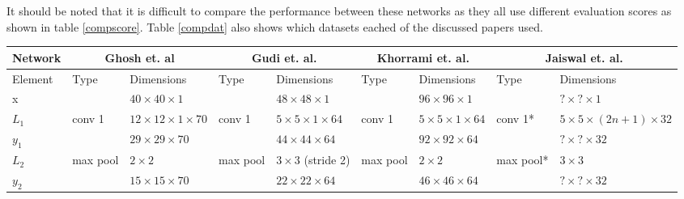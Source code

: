 It should be noted that it is difficult to compare the performance between these
networks as they all use different evaluation scores as shown in table \ref{compscore}. Table \ref{compdat} also shows
which datasets eached of the discussed papers used.
\begin{landscape}
\begin{table}[h!]
{\footnotesize
\begin{tabular}{|lllllllll|}
\hline
Network                      & \multicolumn{2}{c}{Ghosh et. al\cite{Ghosh2015}}                         & \multicolumn{2}{c}{Gudi et. al.\cite{Gudi2015}}                            & \multicolumn{2}{c}{Khorrami et. al.\cite{dodeeplearn}}                          & \multicolumn{2}{c|}{Jaiswal et. al.\cite{Jaiswal2016}}   \\ \hline
\multicolumn{1}{|l|}{Element} & Type     & \multicolumn{1}{l|}{Dimensions}                    & Type     & \multicolumn{1}{l|}{Dimensions}                      & Type          & \multicolumn{1}{l|}{Dimensions}                  & Type      & Dimensions                     \\ \hline
\multicolumn{1}{|l|}{x}       &          & \multicolumn{1}{l|}{$40\times40\times1$}           &          & \multicolumn{1}{l|}{$48\times 48\times1$}            &               & \multicolumn{1}{l|}{$96\times96\times1$}         &           & $?\times?\times1$              \\ \hline
\multicolumn{1}{|l|}{$L_1$}   & conv 1   & \multicolumn{1}{l|}{$12\times 12\times1\times 70$} & conv 1   & \multicolumn{1}{l|}{$5\times 5\times1\times64$}      & conv 1        & \multicolumn{1}{l|}{$5\times5\times1\times64$}   & conv 1*   & $5\times5\times(2n+1)\times32$ \\
\multicolumn{1}{|l|}{$y_1$}   &          & \multicolumn{1}{l|}{$29\times29\times70$}          &          & \multicolumn{1}{l|}{$44\times44\times64$}            &               & \multicolumn{1}{l|}{$92\times92\times64$}        &           & $?\times?\times32$             \\ \hline
\multicolumn{1}{|l|}{$L_2$}   & max pool & \multicolumn{1}{l|}{$2\times 2$}                   & max pool & \multicolumn{1}{l|}{$3\times3$ (stride 2)}           & max pool      & \multicolumn{1}{l|}{$2\times2$}                  & max pool*  & $3\times3$                    \\
\multicolumn{1}{|l|}{$y_2$}   &          & \multicolumn{1}{l|}{$15\times15\times 70$}         &          & \multicolumn{1}{l|}{$22\times 22\times64$}           &               & \multicolumn{1}{l|}{$46\times46\times64$}        &           & $?\times?\times32$             \\ \hline

\end{tabular}}
\end{table}
\end{landscape}

